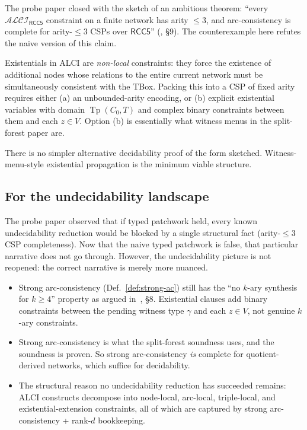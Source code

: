 \documentclass[11pt]{article}
\theoremstyle{definition}
\theoremstyle{remark}
\newcommand{\Tp}{\operatorname{Tp}}
\newcommand{\ALCIRCC}[1]{\mathcal{ALCI}_{\mathsf{RCC#1}}}
\begin{document}
The probe paper closed with the sketch of an ambitious theorem:
``every $\ALCIRCC{5}$ constraint on a finite network has arity
$\leq 3$, and arc-consistency is complete for arity-$\leq 3$ CSPs
over $\mathsf{RCC5}$'' (\cite{PatchworkProbe}, \S9).  The
counterexample here refutes the naive version of this claim.

Existentials in ALCI are \emph{non-local} constraints: they force
the existence of additional nodes whose relations to the entire
current network must be simultaneously consistent with the TBox.
Packing this into a CSP of fixed arity requires either (a) an
unbounded-arity encoding, or (b) explicit existential variables with
domain $\Tp(C_0, T)$ and complex binary constraints between them and
each $z \in V$.  Option (b) is essentially what witness menus in the
split-forest paper are.

There is no simpler alternative decidability proof of the form
sketched.  Witness-menu-style existential propagation is the
minimum viable structure.

\subsection{For the undecidability landscape}

The probe paper observed that if typed patchwork held, every known
undecidability reduction would be blocked by a single structural
fact (arity-$\leq 3$ CSP completeness).  Now that the naive typed
patchwork is false, that particular narrative does not go through.
However, the undecidability picture is not reopened: the correct
narrative is merely more nuanced.
\begin{itemize}
  \item Strong arc-consistency (Def.~\ref{def:strong-ac}) still has
    the ``no $k$-ary synthesis for $k \geq 4$'' property as argued
    in~\cite{PatchworkProbe}, \S8.  Existential clauses add binary
    constraints between the pending witness type $\gamma$ and each
    $z \in V$, not genuine $k$-ary constraints.
  \item Strong arc-consistency is what the split-forest soundness
    uses, and the soundness is proven.  So strong arc-consistency
    \emph{is} complete for quotient-derived networks, which suffice
    for decidability.
  \item The structural reason no undecidability reduction has
    succeeded remains: ALCI constructs decompose into node-local,
    arc-local, triple-local, and existential-extension constraints,
    all of which are captured by strong arc-consistency + rank-$d$
    bookkeeping.
\end{itemize}
\end{document}
